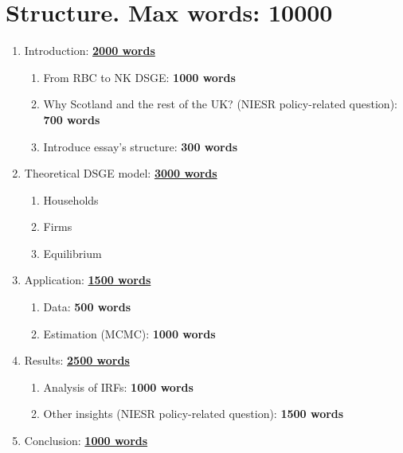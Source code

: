 \section*{Structure. Max words: 10000}

\begin{enumerate}
    \item Introduction: \underline{\textbf{2000 words}}
    \begin{enumerate}
        \item From RBC to NK DSGE: \textbf{1000 words}
        \item Why Scotland and the rest of the UK? (NIESR policy-related question): \textbf{700 words}
        \item Introduce essay's structure: \textbf{300 words}
    \end{enumerate}
    \item Theoretical DSGE model: \underline{\textbf{3000 words}}
    \begin{enumerate}
        \item Households
        \item Firms
        \item Equilibrium
    \end{enumerate}
    \item Application: \underline{\textbf{1500 words}}
    \begin{enumerate}
        \item Data: \textbf{500 words}
        \item Estimation (MCMC): \textbf{1000 words}
    \end{enumerate}
    \item Results: \underline{\textbf{2500 words}}
    \begin{enumerate}
        \item Analysis of IRFs: \textbf{1000 words}
        \item Other insights (NIESR policy-related question): \textbf{1500 words}
    \end{enumerate}
    \item Conclusion: \underline{\textbf{1000 words}}
\end{enumerate}